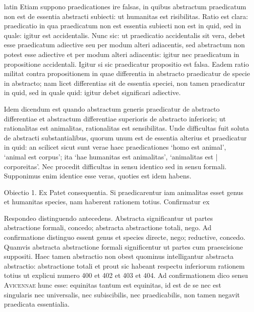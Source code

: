 \begin{otherlanguage*}{latin}
\pstart
Etiam suppono praedicationes ire falsas, in quibus abstractum praedicatum non est de essentia abstracti subiecti:
ut humanitas est risibilitas. Ratio est clara:
praedicatio in qua praedicatum non est essentia subiecti non est in quid, sed in quale:
igitur est accidentalis. Nunc sic:
ut praedicatio accidentalis sit vera, debet esse praedicatum adiective seu per modum alteri adiacentis, sed abstractum non potest esse adiective et per modum alteri adiacentis:
igitur nec praedicatum in propositione accidentali. Igitur si sic praedicatur propositio est falsa. Eadem ratio militat contra propositionem in quae differentia in abstracto praedicatur de specie in abstracto; nam licet differentias sit de essentia speciei, non tamen praedicatur in quid, sed in quale quid:
igitur debet significari adiective. 
\pend

\pstart
Idem dicendum est quando abstractum generis praedicatur de abstracto differentiae et abstractum differentiae superioris de abstracto inferioris; ut rationalitas est animalitas, rationalitas est sensibilitas. Unde difficultas fuit soluta de abstracti substantialibus, quorum unum est de essentia alterius et praedicatur in quid:
an scilicet sicut sunt verae haec praedicationes `homo est animal', `animal est corpus'; ita `hae humanitas est animalitas', `animalitas est \textnormal{|} corporeitas'. Nec procedit difficultas in sensu identico sed in sensu formali. Supponimus enim identice esse veras, quoties est idem habens. 
\pend

\pstart
Obiectio 1. Ex  Patet consequentia. Si praedicarentur iam animalitas esset genus et humanitas species, nam haberent rationem totius. Confirmatur ex  
\pend

\pstart
Respondeo distinguendo antecedens. Abstracta significantur ut partes abstractione formali, concedo; abstracta abstractione totali, nego. Ad confirmatione distinguo essent genus et species directe, nego; reductive, concedo. Quamvis abstracta abstractione formali significentur ut partes cum praescisione suppositi. Haec tamen abstractio non obest quominus intelligantur abstracta abstractio:
abstractione totali et prout sic habeant respectu inferiorum rationem totius ut explicui numero 400 et 402 et 403 et 404. Ad confirmationem dico sensu \textsc{Avicennae} hunc esse:
equinitas tantum est equinitas, id est de se nec est singularis nec universalis, nec subiscibilis, nec praedicabilis, non tamen negavit praedicata essentialia. 
\pend


\end{otherlanguage*}
